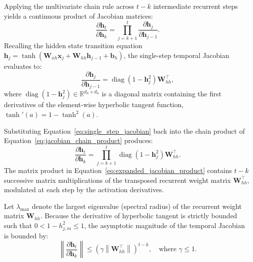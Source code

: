 \documentclass[../../../main.tex]{subfiles}
\begin{document}
Applying the multivariate chain rule across $t - k$ intermediate recurrent steps yields a continuous product of Jacobian matrices:
\begin{equation}
\frac{\partial \mathbf{h}_t}{\partial \mathbf{h}_k} = \prod_{j=k+1}^t \frac{\partial \mathbf{h}_j}{\partial \mathbf{h}_{j-1}}.
\label{eq:jacobian_chain_product}
\end{equation}
Recalling the hidden state transition equation $\mathbf{h}_j = \tanh(\mathbf{W}_{xh} \mathbf{x}_j + \mathbf{W}_{hh} \mathbf{h}_{j-1} + \mathbf{b}_h)$, the single-step temporal Jacobian evaluates to:
\begin{equation}
\frac{\partial \mathbf{h}_j}{\partial \mathbf{h}_{j-1}} = \operatorname{diag}\left(1 - \mathbf{h}_j^2\right) \mathbf{W}_{hh}^\top,
\label{eq:single_step_jacobian}
\end{equation}
where $\operatorname{diag}(1 - \mathbf{h}_j^2) \in \mathbb{R}^{d_h \times d_h}$ is a diagonal matrix containing the first derivatives of the element-wise hyperbolic tangent function, $\tanh'(a) = 1 - \tanh^2(a)$.

Substituting Equation~\ref{eq:single_step_jacobian} back into the chain product of Equation~\ref{eq:jacobian_chain_product} produces:
\begin{equation}
\frac{\partial \mathbf{h}_t}{\partial \mathbf{h}_k} = \prod_{j=k+1}^t \operatorname{diag}\left(1 - \mathbf{h}_j^2\right) \mathbf{W}_{hh}^\top.
\label{eq:expanded_jacobian_product}
\end{equation}
The matrix product in Equation~\ref{eq:expanded_jacobian_product} contains $t - k$ successive matrix multiplications of the transposed recurrent weight matrix $\mathbf{W}_{hh}^\top$, modulated at each step by the activation derivatives.

Let $\lambda_{\max}$ denote the largest eigenvalue (spectral radius) of the recurrent weight matrix $\mathbf{W}_{hh}$. Because the derivative of hyperbolic tangent is strictly bounded such that $0 < 1 - h_{j, m}^2 \le 1$, the asymptotic magnitude of the temporal Jacobian is bounded by:
\begin{equation}
\left\| \frac{\partial \mathbf{h}_t}{\partial \mathbf{h}_k} \right\| \le \left( \gamma \left\| \mathbf{W}_{hh}^\top \right\| \right)^{t - k}, \quad \text{where } \gamma \le 1.
\label{eq:jacobian_norm_bound}
\end{equation}
\end{document}
